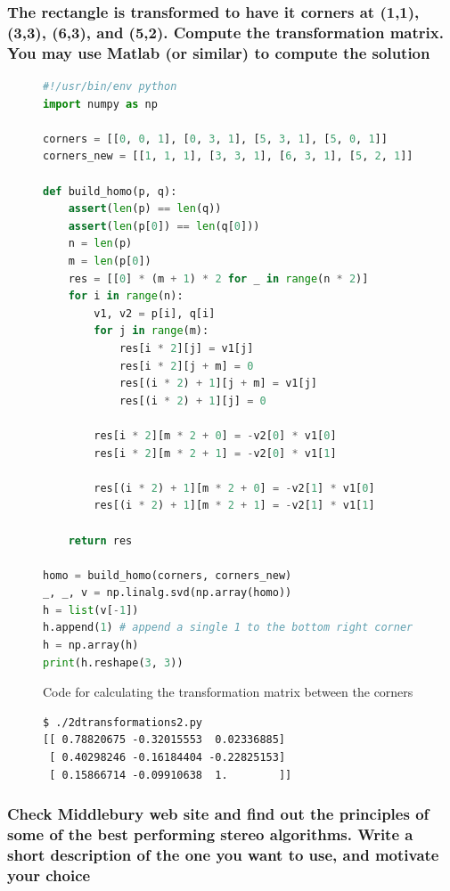 \documentclass[a4paper, titlepage,12pt]{article}
\begin{document}
	\subsubsection*{The rectangle is transformed to have it corners at (1,1), (3,3), (6,3), and (5,2). Compute the transformation matrix. You may use Matlab (or similar) to compute the solution}
	\begin{figure}[H]
		\begin{center}
			\begin{lstlisting}[language=Python]
#!/usr/bin/env python
import numpy as np

corners = [[0, 0, 1], [0, 3, 1], [5, 3, 1], [5, 0, 1]]
corners_new = [[1, 1, 1], [3, 3, 1], [6, 3, 1], [5, 2, 1]]

def build_homo(p, q):
    assert(len(p) == len(q))
    assert(len(p[0]) == len(q[0]))
    n = len(p)
    m = len(p[0])
    res = [[0] * (m + 1) * 2 for _ in range(n * 2)]
    for i in range(n):
        v1, v2 = p[i], q[i]
        for j in range(m):
            res[i * 2][j] = v1[j]
            res[i * 2][j + m] = 0
            res[(i * 2) + 1][j + m] = v1[j]
            res[(i * 2) + 1][j] = 0

        res[i * 2][m * 2 + 0] = -v2[0] * v1[0]
        res[i * 2][m * 2 + 1] = -v2[0] * v1[1]

        res[(i * 2) + 1][m * 2 + 0] = -v2[1] * v1[0]
        res[(i * 2) + 1][m * 2 + 1] = -v2[1] * v1[1]

    return res

homo = build_homo(corners, corners_new)
_, _, v = np.linalg.svd(np.array(homo))
h = list(v[-1])
h.append(1)	# append a single 1 to the bottom right corner
h = np.array(h)
print(h.reshape(3, 3))
			\end{lstlisting}
			\caption{Code for calculating the transformation matrix between the corners}
		\end{center}
	\end{figure}

	\begin{figure}[H]
		\begin{center}
			\begin{lstlisting}
$ ./2dtransformations2.py
[[ 0.78820675 -0.32015553  0.02336885]
 [ 0.40298246 -0.16184404 -0.22825153]
 [ 0.15866714 -0.09910638  1.        ]]
			\end{lstlisting}
		\end{center}
	\end{figure}


	\subsubsection*{Check Middlebury web site and find out the principles of some of the best performing stereo algorithms. Write a short description of the one you want to use, and motivate your choice}
\end{document}
